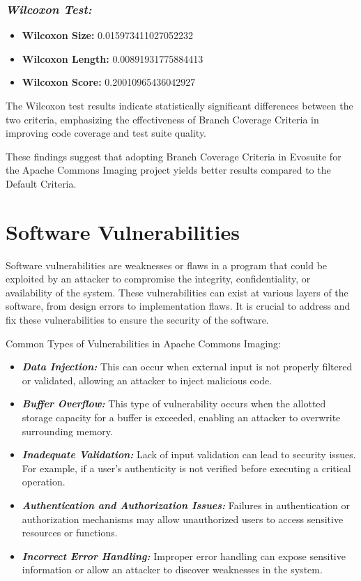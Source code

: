 \documentclass[sigconf]{acmart}
\begin{document}
\subsubsection{\textit{Wilcoxon Test:}}
\begin{itemize}
    \item \textbf{Wilcoxon Size:} 0.015973411027052232
    \item \textbf{Wilcoxon Length:} 0.00891931775884413
    \item \textbf{Wilcoxon Score:} 0.20010965436042927
\end{itemize}

The Wilcoxon test results indicate statistically significant differences between the two criteria, emphasizing the effectiveness of Branch Coverage Criteria in improving code coverage and test suite quality.

These findings suggest that adopting Branch Coverage Criteria in Evosuite for the Apache Commons Imaging project yields better results compared to the Default Criteria.


\section{Software Vulnerabilities}
Software vulnerabilities are weaknesses or flaws in a program that could be exploited by an attacker to compromise the integrity, confidentiality, or availability of the system. These vulnerabilities can exist at various layers of the software, from design errors to implementation flaws. It is crucial to address and fix these vulnerabilities to ensure the security of the software.


Common Types of Vulnerabilities in Apache Commons Imaging:

\begin{itemize}
    \item \textbf{\textit{Data Injection:}} This can occur when external input is not properly filtered or validated, allowing an attacker to inject malicious code.
    
    \item \textbf{\textit{Buffer Overflow:}} This type of vulnerability occurs when the allotted storage capacity for a buffer is exceeded, enabling an attacker to overwrite surrounding memory.
    
    \item \textbf{\textit{Inadequate Validation:}} Lack of input validation can lead to security issues. For example, if a user's authenticity is not verified before executing a critical operation.
    
    \item \textbf{\textit{Authentication and Authorization Issues:}} Failures in authentication or authorization mechanisms may allow unauthorized users to access sensitive resources or functions.
    
    \item \textbf{\textit{Incorrect Error Handling:}} Improper error handling can expose sensitive information or allow an attacker to discover weaknesses in the system.
\end{itemize}
\end{document}
